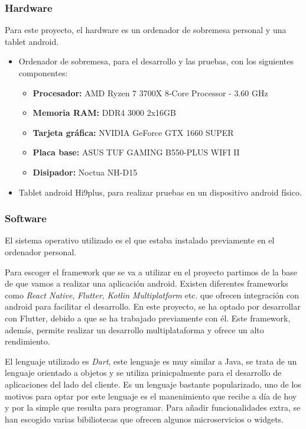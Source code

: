 \documentclass[a4paper, 12pt]{article}
\begin{document}
\subsubsection{Hardware}

Para este proyecto, el hardware es un ordenador de sobremesa personal y una tablet android.

\begin{itemize}[noitemsep]
	\item Ordenador de sobremesa, para el desarrollo y las pruebas, con los siguientes componentes:
		\begin{itemize}[noitemsep]
			\item \textbf{Procesador:} AMD Ryzen 7 3700X 8-Core Processor - 3.60 GHz
			\item \textbf{Memoria RAM:} DDR4 3000 2x16GB
			\item \textbf{Tarjeta gráfica:} NVIDIA GeForce GTX 1660 SUPER
			\item \textbf{Placa base:} ASUS TUF GAMING B550-PLUS WIFI II
			\item \textbf{Disipador:} Noctua NH-D15
		\end{itemize}
	\item Tablet android Hi9plus, para realizar pruebas en un dispositivo android físico.
\end{itemize}

\subsubsection{Software}

El sistema operativo utilizado es el que estaba instalado previamente en el ordenador personal.

Para escoger el framework que se va a utilizar en el proyecto partimos de la base de que vamos a realizar una aplicación android. Existen diferentes frameworks como \textit{React Native}, \textit{Flutter}, \textit{Kotlin Multiplatform} etc. que ofrecen integración con android para facilitar el desarrollo. En este proyecto, se ha optado por desarrollar con Flutter, debido a que se ha trabajado previamente con él. Este framework, además, permite realizar un desarrollo multiplataforma y ofrece un alto rendimiento. 

El lenguaje utilizado es \textit{Dart}, este lenguaje es muy similar a Java, se trata de un lenguaje orientado a objetos y se utiliza prinicpalmente para el desarrollo de aplicaciones del lado del cliente. Es un lenguaje bastante popularizado, uno de los motivos para optar por este lenguaje es el manenimiento que recibe a día de hoy y por la simple que resulta para programar. Para añadir funcionalidades extra, se han escogido varias bibiliotecas que ofrecen algunos microservicios o widgets.
\end{document}
